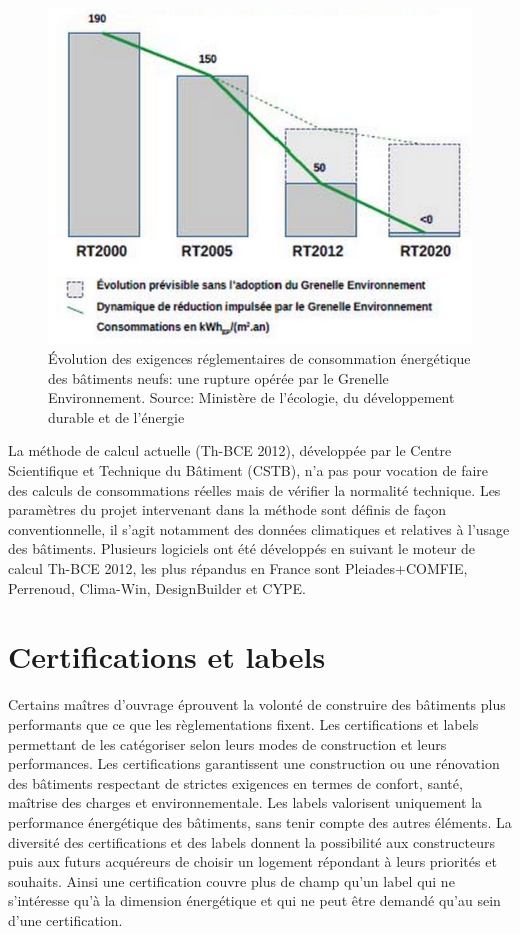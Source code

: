 \begin{figure}
\centering
\includegraphics[scale=0.7]{Images/Evolution_des_performances_des_rt}
\caption{Évolution des exigences réglementaires de consommation énergétique des bâtiments neufs: une rupture opérée par le Grenelle Environnement. Source: Ministère de l'écologie, du développement durable et de l'énergie}
\label{fig:Evolution_des_performances_des_rt}
\end{figure}

La méthode de calcul actuelle (Th-BCE 2012), développée par le Centre Scientifique et Technique du Bâtiment (CSTB), n'a pas pour vocation de faire des calculs de consommations réelles mais de vérifier la normalité technique. Les paramètres du projet intervenant dans la méthode sont définis de façon conventionnelle, il s'agit notamment des données climatiques et relatives à l'usage des bâtiments. Plusieurs logiciels ont été développés en suivant le moteur de calcul Th-BCE 2012, les plus répandus en France sont Pleiades+COMFIE, Perrenoud, Clima-Win, DesignBuilder et CYPE.

\section{Certifications et labels}

Certains maîtres d'ouvrage éprouvent la volonté de construire des bâtiments plus performants que ce que les règlementations fixent. Les certifications et labels permettant de les catégoriser selon leurs modes de construction et leurs performances. Les certifications garantissent une construction ou une rénovation des bâtiments respectant de strictes exigences en termes de confort, santé, maîtrise des charges et environnementale. Les labels valorisent uniquement la performance énergétique des bâtiments, sans tenir compte des autres éléments. La diversité des certifications et des labels donnent la possibilité aux constructeurs puis aux futurs acquéreurs de choisir un logement répondant à leurs priorités et souhaits. Ainsi une certification couvre plus de champ qu'un label qui ne s'intéresse qu'à la dimension énergétique et qui ne peut être demandé qu'au sein d'une certification.

